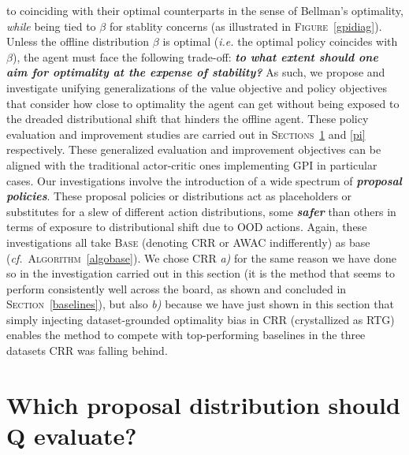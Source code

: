 to coinciding with their optimal counterparts in the sense of Bellman's optimality,
\emph{while} being tied to $\beta$ for stablity concerns
(as illustrated in \textsc{Figure}~\ref{gpidiag}).
Unless the offline distribution $\beta$ is optimal (\textit{i.e.} the optimal policy coincides with $\beta$),
the agent must face the following trade-off: \textbf{\emph{to what extent should one aim for optimality
at the expense of stability?}}
As such, we propose and investigate unifying generalizations of the value objective
and policy objectives that consider how close to optimality the agent can get
without being exposed to the dreaded distributional shift that hinders the offline agent.
These policy evaluation and improvement studies
are carried out in \textsc{Sections}~\ref{pe} and \ref{pi} respectively.
These generalized evaluation and improvement objectives
can be aligned with the traditional actor-critic ones implementing GPI
in particular cases.
Our investigations involve the introduction of a wide spectrum of \textbf{\emph{proposal policies}}.
These proposal policies or distributions
act as placeholders or substitutes for a slew of different action distributions,
some \textbf{\emph{safer}} than others in terms of exposure to distributional shift due to OOD actions.
Again, these investigations all take
\textsc{Base} (denoting CRR
or AWAC indifferently)
as base
(\textit{cf.}~\textsc{Algorithm}~\ref{algobase}).
We chose CRR
\textit{a)}
for the same reason we have done so in the investigation carried out in this section
(it is the method that seems to perform consistently well across the board,
as shown and concluded in \textsc{Section}~\ref{baselines}),
but also
\textit{b)}
because we have just shown in this section that simply injecting dataset-grounded optimality bias
in CRR (crystallized as RTG) enables the method to compete with top-performing baselines in the
three datasets CRR was falling behind.

\section{Which proposal distribution should Q evaluate?}
\label{pe}

